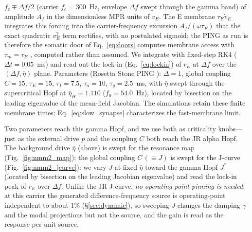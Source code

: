 \documentclass[11pt,a4paper]{article}
\providecommand{\DIFaddtex}[1]{{\protect\color{blue} \sf #1}} %
\providecommand{\DIFdeltex}[1]{{\protect\color{red} \scriptsize #1}} %
\providecommand{\DIFaddbegin}{} %
\providecommand{\DIFaddend}{} %
\providecommand{\DIFdelbegin}{} %
\providecommand{\DIFdelend}{} %
\providecommand{\DIFadd}[1]{\texorpdfstring{\DIFaddtex{#1}}{#1}} %
\providecommand{\DIFdel}[1]{\texorpdfstring{\DIFdeltex{#1}}{}} %
\begin{document}
$f_c\mp\Delta f/2$ (carrier $f_c=300$~Hz, envelope $\Delta f$ swept through the gamma band)
of amplitude $A_f$ in the dimensionless MPR units of $v_E$. The E membrane $\tau_E\dot v_E$
integrates this forcing into the carrier-frequency excursion $A_f/(\omega\tau_E)$ that the
exact quadratic $v_E^2$ term rectifies, with no postulated sigmoid; the PING as run is
therefore \DIFdelbegin \DIFdel{the somatic door of Eq.~\eqref{eq:doors} }\DIFdelend \DIFaddbegin \DIFadd{computes membrane access }\DIFaddend with $\tau_m=\tau_E$\DIFdelbegin \DIFdel{, computed rather
than assumed}\DIFdelend . We
integrate with fixed-step RK4 ($\Delta t=0.05$~ms) and read out the lock-in
(Eq.~\eqref{eq:lockin}) of $r_E$ at $\Delta f$ over the $(\Delta f, \bar\eta)$ plane.
Parameters (Rosetta Stone PING \cite{ruffini2025rosetta}): $\Delta=1$, global coupling
$C=15$, $\tau_E=15$, $\tau_I=7.5$, $\tau_a=10$, $\tau_g=2.5$~ms, with $\bar\eta$ swept
through the supercritical Hopf at $\bar\eta_H=1.110$ ($f_0=54.0$~Hz), located by bisection
on the leading eigenvalue of the mean-field Jacobian. \DIFaddbegin \DIFadd{The simulations retain these
finite membrane times; Eq.~\eqref{eq:slow_synapse} characterizes the fast-membrane limit.
}\DIFaddend

Two parameters reach this gamma Hopf, and we use both as criticality knobs---just as the
external drive $p$ and the coupling $C$ both reach the JR alpha Hopf. The background drive
$\bar\eta$ (above) is swept for the resonance map (Fig.~\ref{fig:nmm2_map}); the global
coupling $C\,(\equiv J)$ is swept for the J-curve (Fig.~\ref{fig:nmm2_jcurve}): we vary
$J$ at fixed $\bar\eta$ toward the gamma Hopf $J^*$ (located by bisection on the leading
Jacobian eigenvalue) and read the lock-in peak of $r_E$ over $\Delta f$. Unlike the JR
J-curve, \emph{no operating-point pinning is needed}: at this carrier the generated
difference-frequency source is operating-point independent to about $1\%$
(\S\ref{sec:dynamic}), so sweeping $J$ changes the damping $\gamma$ and the modal
projections but not the source, and the gain is read as the response per unit source.
\end{document}
